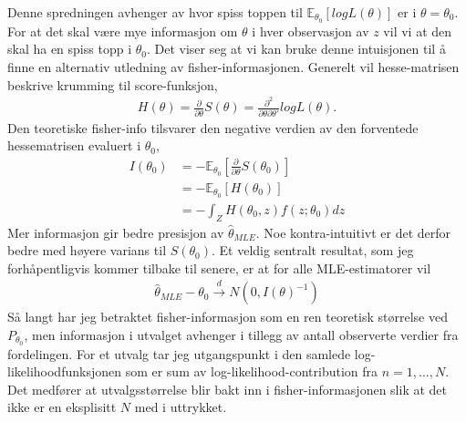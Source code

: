 Denne spredningen avhenger av hvor spiss toppen til $\mathbb{E}_{\theta_0}[logL(\theta)]$ er i $\theta=\theta_0$. For at det skal være mye informasjon om $\theta$ i hver observasjon av $z$ vil vi at den skal ha en spiss topp i $\theta_0$. Det viser seg at vi kan bruke denne intuisjonen til å finne en alternativ utledning av fisher-informasjonen. Generelt vil hesse-matrisen beskrive krumming til score-funksjon,
\begin{align}
H(\theta) = \frac{\partial}{\partial \theta}S(\theta) = \frac{\partial^2}{\partial \theta \partial \theta'}logL(\theta).
\end{align}
Den teoretiske fisher-info tilsvarer den negative verdien av den forventede hessematrisen evaluert i $\theta_0$,
\begin{align}
I(\theta_0) &= -\mathbb{E}_{\theta_0}\left[\frac{\partial}{\partial \theta}S(\theta_0)\right] \\
&= - \mathbb{E}_{\theta_0}\left[H(\theta_0)\right] \\
&= - \int_Z H(\theta_0,z)f(z;\theta_0)dz
\end{align}
Mer informasjon gir bedre presisjon av $\hat{\theta}_{MLE}$. Noe kontra-intuitivt er det derfor bedre med høyere varians til $S(\theta_0)$. Et veldig sentralt resultat, som jeg forhåpentligvis kommer tilbake til senere, er at for alle MLE-estimatorer vil
\begin{align}
\hat{\theta}_{MLE}-\theta_0 \overset{d}{\to} N\left(0,I(\theta)^{-1}\right)
\end{align}
Så langt har jeg betraktet fisher-informasjon som en ren teoretisk størrelse ved $P_{\theta_0}$, men informasjon i utvalget avhenger i tillegg av antall observerte verdier fra fordelingen. For et utvalg tar jeg utgangspunkt i den samlede log-likelihoodfunksjonen som er sum av log-likelihood-contribution fra $n=1,...,N$. Det medfører at utvalgsstørrelse blir bakt inn i fisher-informasjonen slik at det ikke er en eksplisitt $N$ med i uttrykket.
